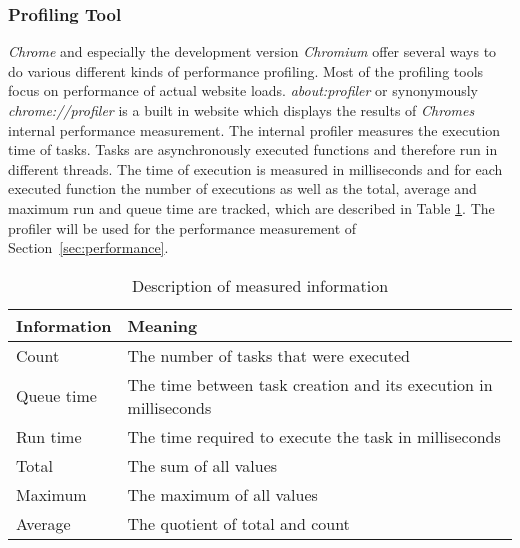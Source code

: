 \subsubsection{Profiling Tool}
\label{sec:profiler}
\emph{Chrome} and especially the development version \emph{Chromium} offer several ways to do various different kinds of performance profiling. Most of the profiling tools focus on performance of actual website loads. \emph{about:profiler} or synonymously \emph{chrome://profiler} is a built in website which displays the results of \emph{Chromes} internal performance measurement. The internal profiler measures the execution time of tasks. Tasks are asynchronously executed functions and therefore run in different threads. The time of execution is measured in milliseconds and for each executed function the number of executions as well as the total, average and maximum run and queue time are tracked, which are described in Table \ref{fig:ex1_info}. The profiler will be used for the performance measurement of Section~\ref{sec:performance}.
\begin{table}
\caption{Description of measured information}
\label{fig:ex1_info}
\begin{tabularx}{\textwidth}{|l|X|}
\hline
Information & Meaning \\ \hline
Count & The number of tasks that were executed \\ \hline
Queue time & The time between task creation and its execution in milliseconds \\ \hline
Run time & The time required to execute the task in milliseconds \\ \hline
Total & The sum of all values \\ \hline
Maximum & The maximum of all values \\ \hline
Average & The quotient of total and count \\ \hline
\end{tabularx}
\end{table}